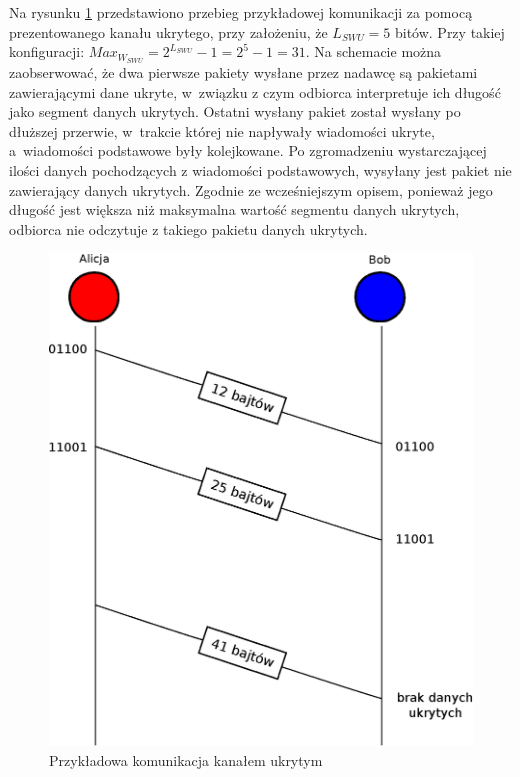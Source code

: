 \documentclass[a4paper, twoside, 12pt]{report}
\begin{document}
    Na rysunku \ref{COMMUNICATION} przedstawiono przebieg przykładowej komunikacji
    za pomocą prezentowanego kanału ukrytego, przy założeniu, że \( L_{SWU} = 5 \) bitów.
    Przy takiej konfiguracji:
    \begin{math}
        Max_{W_{SWU}} = 2^{L_{SWU}} - 1 = 2^5 - 1 = 31
    \end{math}.
    Na schemacie można zaobserwować, że dwa pierwsze pakiety wysłane przez nadawcę
    są pakietami zawierającymi dane ukryte, w~związku z czym odbiorca interpretuje
    ich długość jako segment danych ukrytych. Ostatni wysłany pakiet został wysłany
    po dłuższej przerwie, w~trakcie której nie napływały wiadomości ukryte, a~wiadomości
    podstawowe były kolejkowane. Po zgromadzeniu wystarczającej ilości danych pochodzących
    z wiadomości podstawowych, wysyłany jest pakiet nie zawierający danych ukrytych.
    Zgodnie ze wcześniejszym opisem, ponieważ jego długość jest większa niż maksymalna
    wartość segmentu danych ukrytych, odbiorca nie odczytuje z takiego pakietu
    danych ukrytych.
        \begin{figure}[h]
                \centering
                \includegraphics[scale=0.85]{komunikacja_kanalem_ukrytym_gotowa}
                \caption{Przykładowa komunikacja kanałem ukrytym}
                \label{COMMUNICATION}
        \end{figure}
\end{document}
